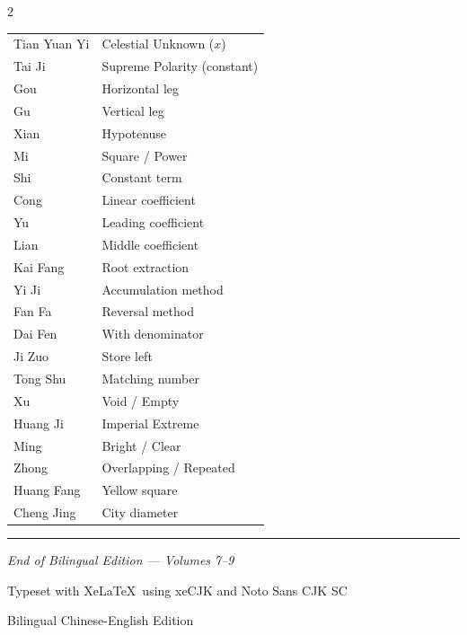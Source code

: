 \documentclass[11pt,a4paper]{article}
\newcommand{\longline}{\noindent\rule{\textwidth}{0.4pt}}
\newcommand{\enpar}[1]{{\itshape #1\par}}
\begin{document}
\begin{paracol}{2}
\enpar{%
\begin{tabular}{ll}
Tian Yuan Yi & Celestial Unknown ($x$) \\
Tai Ji & Supreme Polarity (constant) \\
Gou & Horizontal leg \\
Gu & Vertical leg \\
Xian & Hypotenuse \\
Mi & Square / Power \\
Shi & Constant term \\
Cong & Linear coefficient \\
Yu & Leading coefficient \\
Lian & Middle coefficient \\
Kai Fang & Root extraction \\
Yi Ji & Accumulation method \\
Fan Fa & Reversal method \\
Dai Fen & With denominator \\
Ji Zuo & Store left \\
Tong Shu & Matching number \\
Xu & Void / Empty \\
Huang Ji & Imperial Extreme \\
Ming & Bright / Clear \\
Zhong & Overlapping / Repeated \\
Huang Fang & Yellow square \\
Cheng Jing & City diameter \\
\end{tabular}}

\end{paracol}

\vspace{0.5cm}
\begin{center}
\longline
\end{center}

\vfill
\begin{center}
{\small\textit{End of Bilingual Edition --- Volumes 7--9}}

\vspace{0.3cm}
{\small Typeset with Xe\LaTeX\ using xeCJK and Noto Sans CJK SC}

\vspace{0.2cm}
{\small Bilingual Chinese-English Edition}
\end{center}
\end{document}
